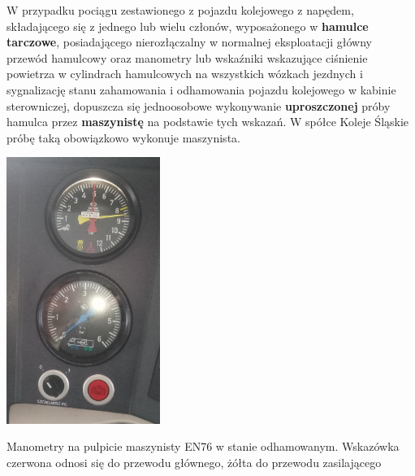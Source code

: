 W przypadku pociągu zestawionego z pojazdu kolejowego z napędem, składającego się z jednego lub wielu członów, wyposażonego w\textbf{ hamulce tarczowe}, posiadającego nierozłączalny w normalnej eksploatacji główny przewód hamulcowy oraz manometry lub wskaźniki wskazujące ciśnienie powietrza w cylindrach hamulcowych na wszystkich wózkach jezdnych i sygnalizację stanu zahamowania i odhamowania pojazdu kolejowego w kabinie sterowniczej, dopuszcza się jednoosobowe wykonywanie \textbf{uproszczonej} próby hamulca przez \textbf{maszynistę} na podstawie tych wskazań. W spółce Koleje Śląskie próbę taką obowiązkowo wykonuje maszynista.
\begin{marginfigure}
	\includegraphics[width=5cm]{skryptkierownik-img/manometry-odhamowane.jpg}
	\caption{Manometry na pulpicie maszynisty EN76 w stanie odhamowanym. Wskazówka czerwona odnosi się do przewodu głównego, żółta do przewodu zasilającego}
\end{marginfigure}

